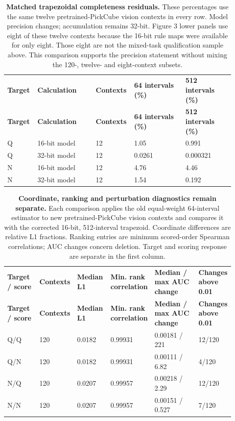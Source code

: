 \setlength{\tabcolsep}{2pt}
\begin{longtable}{p{0.120\linewidth} p{0.250\linewidth} p{0.120\linewidth} p{0.220\linewidth} p{0.210\linewidth}}
\noalign{\addtocounter{table}{-1}}
\caption*{\textbf{Matched trapezoidal completeness residuals.} These percentages use the same twelve pretrained-PickCube vision contexts in every row. Model precision changes; accumulation remains 32-bit. Figure 3 lower panels use eight of these twelve contexts because the 16-bit rule maps were available for only eight. Those eight are not the mixed-task qualification sample above. This comparison supports the precision statement without mixing the 120-, twelve- and eight-context subsets.}\\
\toprule
\textbf{Target} & \textbf{Calculation} & \textbf{Contexts} & \textbf{64 intervals (\%)} & \textbf{512 intervals (\%)} \\
\midrule\endfirsthead
\toprule
\textbf{Target} & \textbf{Calculation} & \textbf{Contexts} & \textbf{64 intervals (\%)} & \textbf{512 intervals (\%)} \\
\midrule\endhead
\bottomrule\endfoot
Q & 16-bit model & 12 & 1.05 & 0.991 \\
Q & 32-bit model & 12 & 0.0261 & 0.000321 \\
N & 16-bit model & 12 & 4.76 & 4.46 \\
N & 32-bit model & 12 & 1.54 & 0.192 \\
\end{longtable}

\setlength{\tabcolsep}{2pt}
\begin{longtable}{p{0.150\linewidth} p{0.100\linewidth} p{0.150\linewidth} p{0.160\linewidth} p{0.230\linewidth} p{0.130\linewidth}}
\noalign{\addtocounter{table}{-1}}
\caption*{\textbf{Coordinate, ranking and perturbation diagnostics remain separate.} Each comparison applies the old equal-weight 64-interval estimator to new pretrained-PickCube vision contexts and compares it with the corrected 16-bit, 512-interval trapezoid. Coordinate differences are relative L1 fractions. Ranking entries are minimum scored-order Spearman correlations; AUC changes concern deletion. Target and scoring response are separate in the first column.}\\
\toprule
\textbf{Target / score} & \textbf{Contexts} & \textbf{Median L1} & \textbf{Min. rank correlation} & \textbf{Median / max AUC change} & \textbf{Changes above 0.01} \\
\midrule\endfirsthead
\toprule
\textbf{Target / score} & \textbf{Contexts} & \textbf{Median L1} & \textbf{Min. rank correlation} & \textbf{Median / max AUC change} & \textbf{Changes above 0.01} \\
\midrule\endhead
\bottomrule\endfoot
Q/Q & 120 & 0.0182 & 0.99931 & 0.00181 / 221 & 12/120 \\
Q/N & 120 & 0.0182 & 0.99931 & 0.00111 / 6.82 & 4/120 \\
N/Q & 120 & 0.0207 & 0.99957 & 0.00218 / 2.29 & 12/120 \\
N/N & 120 & 0.0207 & 0.99957 & 0.00151 / 0.527 & 7/120 \\
\end{longtable}

